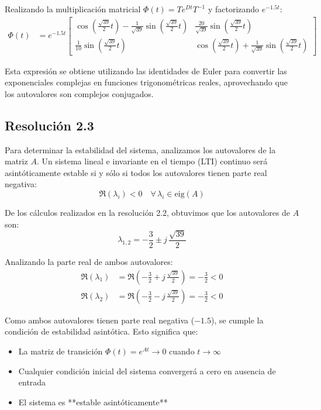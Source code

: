 \documentclass[
  11pt,
  letterpaper,
   addpoints,
   answers
  ]{exam}
\begin{document}
\begin{solution}
Realizando la multiplicación matricial $\Phi(t) = T e^{Dt} T^{-1}$ y factorizando $e^{-1.5t}$:
\begin{align}
\Phi(t) &= e^{-1.5t} \begin{bmatrix}
\cos\left(\frac{\sqrt{39}}{2}t\right) - \frac{1}{\sqrt{39}}\sin\left(\frac{\sqrt{39}}{2}t\right) & \frac{20}{\sqrt{39}}\sin\left(\frac{\sqrt{39}}{2}t\right) \\[6pt]
\frac{1}{10}\sin\left(\frac{\sqrt{39}}{2}t\right) & \cos\left(\frac{\sqrt{39}}{2}t\right) + \frac{1}{\sqrt{39}}\sin\left(\frac{\sqrt{39}}{2}t\right)
\end{bmatrix}
\end{align}

Esta expresión se obtiene utilizando las identidades de Euler para convertir las exponenciales complejas en funciones trigonométricas reales, aprovechando que los autovalores son complejos conjugados.
\subsection*{Resolución 2.3}

Para determinar la estabilidad del sistema, analizamos los autovalores de la matriz $A$. Un sistema lineal e invariante en el tiempo (LTI) continuo será asintóticamente estable si y sólo si todos los autovalores tienen parte real negativa:
\begin{equation}
\Re(\lambda_i) < 0 \quad \forall\,\lambda_i \in \mathrm{eig}(A)
\end{equation}

De los cálculos realizados en la resolución 2.2, obtuvimos que los autovalores de $A$ son:
\begin{equation}
\lambda_{1,2} = -\frac{3}{2} \pm j\,\frac{\sqrt{39}}{2}
\end{equation}

Analizando la parte real de ambos autovalores:
\begin{align}
\Re(\lambda_1) &= \Re\left(-\frac{3}{2} + j\,\frac{\sqrt{39}}{2}\right) = -\frac{3}{2} < 0 \\
\Re(\lambda_2) &= \Re\left(-\frac{3}{2} - j\,\frac{\sqrt{39}}{2}\right) = -\frac{3}{2} < 0
\end{align}

Como ambos autovalores tienen parte real negativa ($-1.5$), se cumple la condición de estabilidad asintótica. Esto significa que:
\begin{itemize}
\item La matriz de transición $\Phi(t) = e^{At} \to 0$ cuando $t \to \infty$
\item Cualquier condición inicial del sistema convergerá a cero en ausencia de entrada
\item El sistema es **estable asintóticamente**
\end{itemize}


\end{solution}
\end{document}
